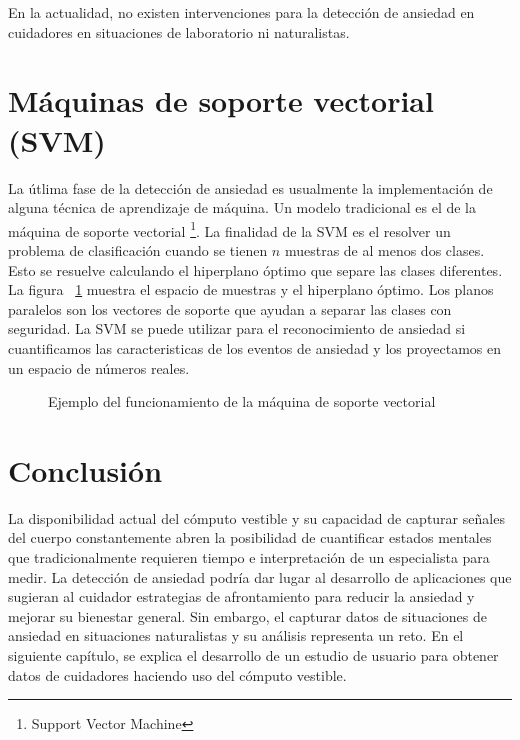 En la actualidad, no existen intervenciones para la detecci\'on de ansiedad en cuidadores en situaciones de laboratorio ni naturalistas.
\section{M\'aquinas de soporte vectorial (SVM)}
La \'utlima fase de la detecci\'on de ansiedad es usualmente la implementaci\'on de alguna t\'ecnica de aprendizaje de m\'aquina. Un modelo tradicional es el de la m\'aquina de soporte vectorial \footnote{Support Vector Machine}. La finalidad de la SVM es el resolver un problema de clasificaci\'on cuando se tienen $n$ muestras de al menos dos clases. Esto se resuelve calculando el hiperplano \'optimo que separe las clases diferentes. La figura ~\ref{fig:svm} muestra el espacio de muestras y el hiperplano \'optimo. Los planos paralelos son los vectores de soporte que ayudan a separar las clases con seguridad. La SVM se puede utilizar para el reconocimiento de ansiedad si cuantificamos las caracteristicas de los eventos de ansiedad y los proyectamos en un espacio de n\'umeros reales.
\begin{figure}[h]
	\centering
	\caption{Ejemplo del funcionamiento de la m\'aquina de soporte vectorial} \label{fig:svm}
\end{figure}

\section{Conclusi\'on}\label{secc:conclution}
La disponibilidad actual del c\'omputo vestible y su capacidad de capturar se\~nales del cuerpo constantemente abren la posibilidad de cuantificar estados mentales que tradicionalmente requieren tiempo e interpretaci\'on de un especialista para medir. La detecci\'on de ansiedad podr\'ia dar lugar al desarrollo de aplicaciones que sugieran al cuidador estrategias de afrontamiento para reducir la ansiedad y mejorar su bienestar general. Sin embargo, el capturar datos de situaciones de ansiedad en situaciones naturalistas y su an\'alisis representa un reto. En el siguiente cap\'itulo, se explica el desarrollo de un estudio de usuario para obtener datos de cuidadores haciendo uso del c\'omputo vestible.
\newpage
